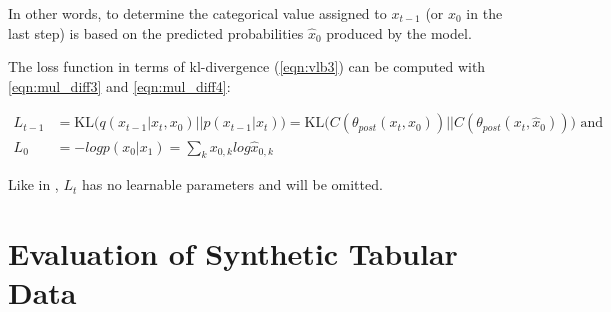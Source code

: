 In other words, to determine the categorical value assigned to $x_{t-1}$ (or $x_0$ in the last step) is based on the predicted probabilities $\hat{x}_0$ produced by the model.


The loss function in terms of \gls{kl}-divergence (\autoref{eqn:vlb3}) can be computed with \autoref{eqn:mul_diff3} and \autoref{eqn:mul_diff4}:

\begin{equation}
  \begin{align*}
    \label{eqn:mul_diff5}
    L_{t-1}&=\text{KL}\Big(q(x_{t-1}|x_t, x_0)\big\vert\big\vert p(x_{t-1}|x_t)\Big) = \text{KL}\Big(C(\theta_{post}(x_t, x_0))\big\vert\big\vert C(\theta_{post}(x_t, \hat{x}_0))\Big) \textrm{ and}\\
    L_{0} &= -logp(x_0|x_1) = \sum_{k}^{}x_{0,k}log\hat{x}_{0,k}
  \end{align*}
\end{equation}

Like in \cite{ho2020DenoisingDiffusionProbabilistic}, $L_{t}$ has no learnable parameters and will be omitted.


\section{Evaluation of Synthetic Tabular Data}
\label{ch:preliminaries-evaluationOfSyntheticTabularData}

